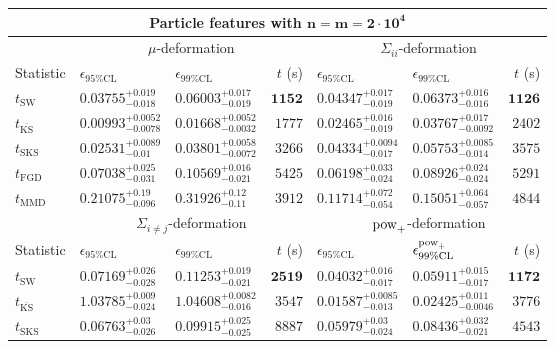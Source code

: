 \begin{tabular}{l|llr|llr}
	\toprule
	\multicolumn{7}{c}{{\bf Particle features with $\mathbf{n=m=2\cdot 10^{4}}$}} \\
	\toprule
	\multicolumn{1}{c}{} & \multicolumn{3}{c}{$\mu$-deformation} & \multicolumn{3}{c}{$\Sigma_{ii}$-deformation} \\
	Statistic & $\epsilon_{95\%\mathrm{CL}}$ & $\epsilon_{99\%\mathrm    {CL}}$ & $t$ (s) & $\epsilon_{95\%\mathrm{CL}}$ & $\epsilon_{99\%\mathrm{CL}}$ & $t$ (s) \\
	\midrule
	$t_{\mathrm{SW}}$ & $0.03755_{-0.018}^{+0.019}$ & $0.06003_{-0.019}^{+0.017}$ & ${\mathbf{1152}}$ & $0.04347_{-0.019}^{+0.017}$ & $0.06373_{-0.016}^{+0.016}$ & ${\mathbf{1126}}$ \\
	$t_{\overline{\mathrm{KS}}}$ & ${\mathbf{0.00993_{-0.0078}^{+0.0052}}}$ & ${\mathbf{0.01668_{-0.0032}^{+0.0052}}}$ & $1777$ & ${\mathbf{0.02465_{-0.019}^{+0.016}}}$ & ${\mathbf{0.03767_{-0.0092}^{+0.017}}}$ & $2402$ \\
	$t_{\mathrm{SKS}}$ & $0.02531_{-0.01}^{+0.0089}$ & $0.03801_{-0.0072}^{+0.0058}$ & $3266$ & $0.04334_{-0.017}^{+0.0094}$ & $0.05753_{-0.014}^{+0.0085}$ & $3575$ \\
	$t_{\mathrm{FGD}}$ & $0.07038_{-0.031}^{+0.025}$ & $0.10569_{-0.021}^{+0.016}$ & $5425$ & $0.06198_{-0.024}^{+0.033}$ & $0.08926_{-0.024}^{+0.024}$ & $5291$ \\
	$t_{\mathrm{MMD}}$ & $0.21075_{-0.096}^{+0.19}$ & $0.31926_{-0.11}^{+0.12}$ & $3912$ & $0.11714_{-0.054}^{+0.072}$ & $0.15051_{-0.057}^{+0.064}$ & $4844$ \\
	\toprule
	\multicolumn{1}{c}{} & \multicolumn{3}{c}{$\Sigma_{i\neq j}$-deformation} & \multicolumn{3}{c}{$\rm{pow}_{+}$-deformation} \\
	Statistic & $\epsilon_{95\%\mathrm{CL}}$ & $\epsilon_{99\%\mathrm{CL}}$ & $t$ (s) & $\epsilon_{95\%\mathrm{CL}}$ & $\epsilon^{\rm   {pow}_{+}}_{99\%\mathrm{CL}}$ & $t$ (s) \\
	\midrule
	$t_{\mathrm{SW}}$ & $0.07169_{-0.028}^{+0.026}$ & $0.11253_{-0.021}^{+0.019}$ & ${\mathbf{2519}}$ & $0.04032_{-0.017}^{+0.016}$ & $0.05911_{-0.017}^{+0.015}$ & ${\mathbf{1172}}$ \\
	$t_{\overline{\mathrm{KS}}}$ & $1.03785_{-0.024}^{+0.009}$ & $1.04608_{-0.016}^{+0.0082}$ & $3547$ & ${\mathbf{0.01587_{-0.013}^{+0.0085}}}$ & ${\mathbf{0.02425_{-0.0046}^{+0.011}}}$ & $3776$ \\
	$t_{\mathrm{SKS}}$ & $0.06763_{-0.026}^{+0.03}$ & $0.09915_{-0.025}^{+0.025}$ & $8887$ & $0.05979_{-0.024}^{+0.03}$ & $0.08436_{-0.021}^{+0.032}$ & $4543$ \\

\end{tabular}
